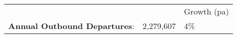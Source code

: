 \begin{tabular}[t]{p{5cm}p{1.3cm}p{1.2cm}}
   &   & Growth (pa) \\ 
 \textbf{Annual Outbound Departures}: & 2,279,607 & 4\% \\ 
  \end{tabular}
